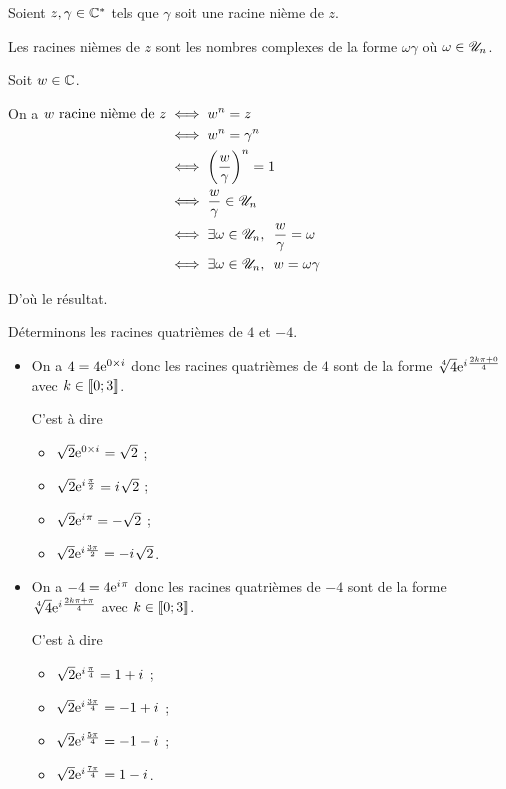\begin{prop}
Soient \(z,\gamma\in\mathbb{C}^*\) tels que \(\gamma\) soit une racine nième de \(z\).

Les racines nièmes de \(z\) sont les nombres complexes de la forme \(\omega\gamma\) où \(\omega\in\mathscr{U}_n\).
\end{prop}

\begin{dem}
Soit \(w\in\mathbb{C}\).

On a \(\begin{aligned}[t]
w\text{ racine nième de }z&\ssi w^n=z \\
&\ssi w^n=\gamma^n \\
&\ssi\paren{\dfrac{w}{\gamma}}^n=1 \\
&\ssi\dfrac{w}{\gamma}\in\U_n \\
&\ssi\quantifs{\exists\omega\in\U_n}\dfrac{w}{\gamma}=\omega \\
&\ssi\quantifs{\exists\omega\in\U_n}w=\omega\gamma
\end{aligned}\)

D'où le résultat.
\end{dem}

\begin{ex}
Déterminons les racines quatrièmes de \(4\) et \(-4\).

\begin{itemize}
\item On a \(4=4\mathrm{e}^{0\times i\mkern1mu}\) donc les racines quatrièmes de \(4\) sont de la forme \(\sqrt[4]{4}\mathrm{e}^{i\mkern1mu\frac{2k\pi+0}{4}}\) avec \(k\in\left\llbracket0;3\right\rrbracket\).

C'est à dire \begin{itemize}
\item \(\sqrt{2}\mathrm{e}^{0\times i\mkern1mu}=\sqrt{2}\) ;

\item \(\sqrt{2}\mathrm{e}^{i\mkern1mu\frac{\pi}{2}}=i\mkern1mu\sqrt{2}\) ;

\item \(\sqrt{2}\mathrm{e}^{i\mkern1mu\pi}=-\sqrt{2}\) ;

\item \(\sqrt{2}\mathrm{e}^{i\mkern1mu\frac{3\pi}{2}}=-i\mkern1mu\sqrt{2}\).
\end{itemize}

\item On a \(-4=4\mathrm{e}^{i\mkern1mu\pi}\) donc les racines quatrièmes de \(-4\) sont de la forme \(\sqrt[4]{4}\mathrm{e}^{i\mkern1mu\frac{2k\pi+\pi}{4}}\) avec \(k\in\left\llbracket0;3\right\rrbracket\).

C'est à dire \begin{itemize}
\item \(\sqrt{2}\mathrm{e}^{i\mkern1mu\frac{\pi}{4}}=1+i\mkern1mu\) ;

\item \(\sqrt{2}\mathrm{e}^{i\mkern1mu\frac{3\pi}{4}}=-1+i\mkern1mu\) ;

\item \(\sqrt{2}\mathrm{e}^{i\mkern1mu\frac{5\pi}{4}}=-1-i\mkern1mu\) ;

\item \(\sqrt{2}\mathrm{e}^{i\mkern1mu\frac{7\pi}{4}}=1-i\mkern1mu\).
\end{itemize}
\end{itemize}
\end{ex}

